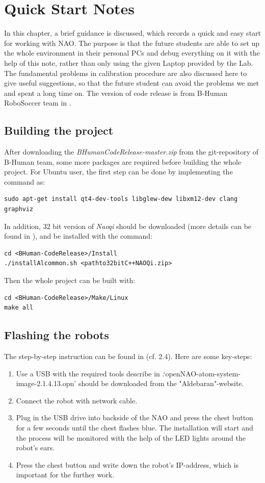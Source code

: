 \chapter{Quick Start Notes}\label{Chap:Quick}
In this chapter, a brief guidance is discussed, which records a quick and easy start for working with NAO. The purpose is that the future students are able to set up the whole environment in their personal PCs and debug everything on it with the help of this note, rather than only using the given Laptop provided by the Lab. The fundamental problems in calibration procedure are also discussed here to give useful suggestions, so that the future student can avoid the problems we met and spent a long time on. The version of code release is from B-Human RoboSoccer team in \cite{BHumanCodeRelease2015}.

\clearpage
\section{Building the project}
After downloading the \textit{BHumanCodeRelease-master.zip} from the git-repository of B-Human team, some more packages are required before building the whole project. For Ubuntu user, the first step can be done by implementing the command as:
\begin{lstlisting}
sudo apt-get install qt4-dev-tools libglew-dew libxm12-dev clang graphviz
\end{lstlisting}
In addition, 32 bit version of \textit{Naoqi} should be downloaded (more details can be found in \cite{robotumwiki}), and be installed with the command:
\begin{lstlisting}
cd <BHuman-CodeRelease>/Install
./installAlcommon.sh <pathto32bitC++NAOQi.zip>
\end{lstlisting}
Then the whole project can be built with:
\begin{lstlisting}
cd <BHuman-CodeRelease>/Make/Linux
make all
\end{lstlisting}

\section{Flashing the robots}
The step-by-step instruction can be found in \cite{BHumanCodeRelease2013}(cf. 2.4). Here are some key-steps:
\begin{enumerate}
    \item Use a USB with the required tools describe in \cite{BHumanCodeRelease2013}.`openNAO-atom-system-image-2.1.4.13.opn' should be downloaded from the "Aldebaran"-website.
    \item Connect the robot with network cable.
    \item Plug in the USB drive into backside of the NAO and press the chest button for a few seconds until the chest flashes blue. The installation will start and the process will be monitored with the help of the LED lights around the robot's ears.
    \item Press the chest button and write down the robot's IP-address, which is important for the further work.
\end{enumerate}

